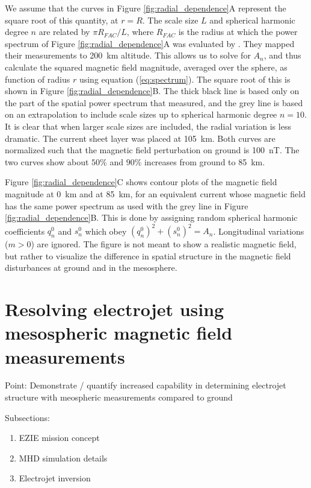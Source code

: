 \documentclass[draft]{agujournal2019}
\begin{document}
We assume that the curves in Figure \ref{fig:radial_dependence}A represent the square root of this quantity, at $r=R$. The scale size $L$ and spherical harmonic degree $n$ are related by $\pi R_{FAC}/L$, where $R_{FAC}$ is the radius at which the power spectrum of Figure \ref{fig:radial_dependence}A was evaluated by \cite{Gjerloev11}. They mapped their measurements to 200~km altitude. This allows us to solve for $A_n$, and thus calculate the squared magnetic field magnitude, averaged over the sphere, as function of radius $r$ using equation (\ref{eq:spectrum}). The square root of this is shown in Figure \ref{fig:radial_dependence}B. The thick black line is based only on the part of the spatial power spectrum that \cite{Gjerloev11} measured, and the grey line is based on an extrapolation to include scale sizes up to spherical harmonic degree $n=10$. It is clear that when larger scale sizes are included, the radial variation is less dramatic. The current sheet layer was placed at 105~km. Both curves are normalized such that the magnetic field perturbation on ground is 100~nT. The two curves show about $50\%$ and $90\%$ increases from ground to 85~km. 

Figure \ref{fig:radial_dependence}C shows contour plots of the magnetic field magnitude at 0~km and at 85~km, for an equivalent current whose magnetic field has the same power spectrum as used with the grey line in Figure \ref{fig:radial_dependence}B. This is done by assigning random spherical harmonic coefficients $q_n^0$ and $s_n^0$ which obey $(q_n^0)^2 + (s_n^0)^2 = A_n$. Longitudinal variations ($m>0$) are ignored. The figure is not meant to show a realistic magnetic field, but rather to visualize the difference in spatial structure in the magnetic field disturbances at ground and in the mesosphere. 







\section{Resolving electrojet using mesospheric magnetic field measurements}
Point: Demonstrate / quantify increased capability in determining electrojet structure with meospheric measurements compared to ground



Subsections:
\begin{enumerate}
\item EZIE mission concept
\item MHD simulation details
\item Electrojet inversion
\end{enumerate}
\end{document}
